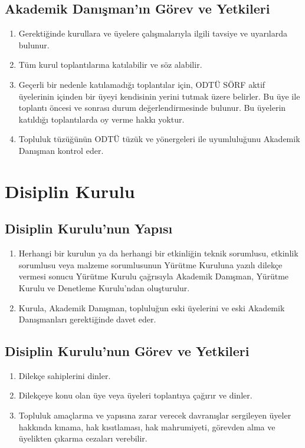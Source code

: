 \documentclass[11pt,a4paper]{article}
\begin{document}
\subsection{Akademik Danışman'ın Görev ve Yetkileri}
\begin{enumerate}
    \item Gerektiğinde kurullara ve üyelere çalışmalarıyla ilgili tavsiye ve uyarılarda bulunur.
    \item Tüm kurul toplantılarına katılabilir ve söz alabilir.
    \item Geçerli bir nedenle katılamadığı toplantılar için, ODTÜ SÖRF aktif üyelerinin içinden bir üyeyi kendisinin yerini tutmak üzere belirler. Bu üye ile toplantı öncesi ve sonrası durum değerlendirmesinde bulunur. Bu üyelerin katıldığı toplantılarda oy verme hakkı yoktur.
    \item Topluluk tüzüğünün ODTÜ tüzük ve yönergeleri ile uyumluluğunu Akademik Danışman kontrol eder.
\end{enumerate}


\section{Disiplin Kurulu}

\subsection{Disiplin Kurulu'nun Yapısı}
\begin{enumerate}
    \item Herhangi bir kurulun ya da herhangi bir etkinliğin teknik sorumlusu, etkinlik sorumlusu veya malzeme sorumlusunun Yürütme Kuruluna yazılı dilekçe vermesi sonucu Yürütme Kurulu çağrısıyla Akademik Danışman, Yürütme Kurulu ve Denetleme Kurulu’ndan oluşturulur.
    \item Kurula, Akademik Danışman, topluluğun eski üyelerini ve eski Akademik Danışmanları gerektiğinde davet eder.
\end{enumerate}

\subsection{Disiplin Kurulu'nun Görev ve Yetkileri}
\begin{enumerate}
    \item Dilekçe sahiplerini dinler.
    \item Dilekçeye konu olan üye veya üyeleri toplantıya çağırır ve dinler.
    \item Topluluk amaçlarına ve yapısına zarar verecek davranışlar sergileyen üyeler hakkında kınama, hak kısıtlaması, hak mahrumiyeti, görevden alma ve üyelikten çıkarma cezaları verebilir.
\end{enumerate}
\end{document}
